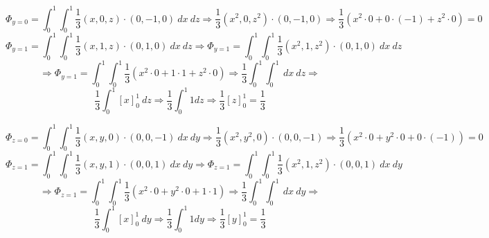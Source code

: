 \[\Phi_{y=0} = \int_{0}^{1}\int_{0}^{1} \frac{1}{3}(x,0,z) \cdot (0,-1,0)\ dx \ dz \Rightarrow\frac{1}{3}(x^2, 0, z^2) \cdot (0,-1,0) \Rightarrow \frac{1}{3} \left(x^2 \cdot 0 + 0 \cdot (-1) + z^2\cdot 0\right) = 0  \]
\[\Phi_{y=1} = \int_{0}^{1}\int_{0}^{1} \frac{1}{3}(x,1,z) \cdot (0,1,0)\ dx \ dz \Rightarrow \Phi_{y=1} = \int_{0}^{1}\int_{0}^{1} \frac{1}{3}(x^2, 1, z^2) \cdot (0,1,0) \ dx \ dz \]
\[\Rightarrow \Phi_{y=1} = \int_{0}^{1}\int_{0}^{1}\frac{1}{3} \left(x^2 \cdot 0 + 1\cdot 1 + z^2\cdot 0\right)  
\Rightarrow \frac{1}{3} \int_{0}^{1}\int_{0}^{1} \ dx \ dz \Rightarrow \]
\[\frac{1}{3} \int_{0}^{1} \left[x\right]_0^1 \ dz \Rightarrow \frac{1}{3} \int_{0}^{1} 1 dz \Rightarrow \frac{1}{3} \left[z\right]_0^1 = \frac{1}{3} \]




\[\Phi_{z=0} = \int_{0}^{1}\int_{0}^{1} \frac{1}{3}(x,y,0) \cdot (0,0,-1)\ dx \ dy \Rightarrow\frac{1}{3}(x^2, y^2, 0) \cdot (0,0,-1) \Rightarrow \frac{1}{3} \left(x^2 \cdot 0 + y^2 \cdot 0 + 0\cdot (-1)\right) = 0  \]
\[\Phi_{z=1} = \int_{0}^{1}\int_{0}^{1} \frac{1}{3}(x,y,1) \cdot (0,0,1)\ dx \ dy \Rightarrow \Phi_{z=1} = \int_{0}^{1}\int_{0}^{1} \frac{1}{3}(x^2, 1, z^2) \cdot (0,0,1) \ dx \ dy \]
\[\Rightarrow \Phi_{z=1} = \int_{0}^{1}\int_{0}^{1}\frac{1}{3} \left(x^2 \cdot 0 + y^2\cdot 0 + 1\cdot 1\right)  
\Rightarrow \frac{1}{3} \int_{0}^{1}\int_{0}^{1} \ dx \ dy \Rightarrow \]
\[\frac{1}{3} \int_{0}^{1} \left[x\right]_0^1 \ dy \Rightarrow \frac{1}{3} \int_{0}^{1} 1 dy \Rightarrow \frac{1}{3} \left[y\right]_0^1 = \frac{1}{3} \]





